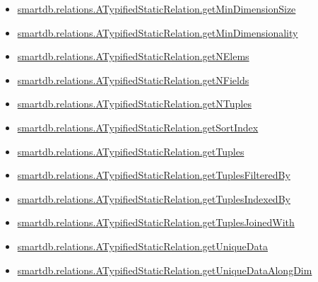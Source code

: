 \documentclass[letterpaper,10pt,english]{sphinxmanual}
\begin{document}
\begin{itemize}
\item {} 
{\hyperref[chap_functions:smartdb-relations-atypifiedstaticrelation-getmindimensionsize]{smartdb.relations.ATypifiedStaticRelation.getMinDimensionSize}}

\item {} 
{\hyperref[chap_functions:smartdb-relations-atypifiedstaticrelation-getmindimensionality]{smartdb.relations.ATypifiedStaticRelation.getMinDimensionality}}

\item {} 
{\hyperref[chap_functions:smartdb-relations-atypifiedstaticrelation-getnelems]{smartdb.relations.ATypifiedStaticRelation.getNElems}}

\item {} 
{\hyperref[chap_functions:smartdb-relations-atypifiedstaticrelation-getnfields]{smartdb.relations.ATypifiedStaticRelation.getNFields}}

\item {} 
{\hyperref[chap_functions:smartdb-relations-atypifiedstaticrelation-getntuples]{smartdb.relations.ATypifiedStaticRelation.getNTuples}}

\item {} 
{\hyperref[chap_functions:smartdb-relations-atypifiedstaticrelation-getsortindex]{smartdb.relations.ATypifiedStaticRelation.getSortIndex}}

\item {} 
{\hyperref[chap_functions:smartdb-relations-atypifiedstaticrelation-gettuples]{smartdb.relations.ATypifiedStaticRelation.getTuples}}

\item {} 
{\hyperref[chap_functions:smartdb-relations-atypifiedstaticrelation-gettuplesfilteredby]{smartdb.relations.ATypifiedStaticRelation.getTuplesFilteredBy}}

\item {} 
{\hyperref[chap_functions:smartdb-relations-atypifiedstaticrelation-gettuplesindexedby]{smartdb.relations.ATypifiedStaticRelation.getTuplesIndexedBy}}

\item {} 
{\hyperref[chap_functions:smartdb-relations-atypifiedstaticrelation-gettuplesjoinedwith]{smartdb.relations.ATypifiedStaticRelation.getTuplesJoinedWith}}

\item {} 
{\hyperref[chap_functions:smartdb-relations-atypifiedstaticrelation-getuniquedata]{smartdb.relations.ATypifiedStaticRelation.getUniqueData}}

\item {} 
{\hyperref[chap_functions:smartdb-relations-atypifiedstaticrelation-getuniquedataalongdim]{smartdb.relations.ATypifiedStaticRelation.getUniqueDataAlongDim}}


\end{itemize}
\end{document}
